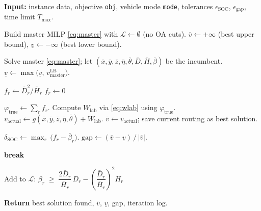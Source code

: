 \begin{algorithm}[t]
\caption{Outer-Approximation L-Shaped Method for the EID-VRP}
\label{alg:lshaped}
\begin{algorithmic}[1]

\State \textbf{Input:} instance data, objective \texttt{obj},
       vehicle mode \texttt{mode}, tolerances $\epsilon_{\text{SOC}}$,
       $\epsilon_{\text{gap}}$, time limit $T_{\max}$.

\State Build master MILP \eqref{eq:master} with
       $\mathcal{L} \leftarrow \emptyset$ (no OA cuts).
\State $\overline{v} \leftarrow +\infty$ \;(best upper bound),\quad
       $\underline{v} \leftarrow -\infty$ \;(best lower bound).

\Repeat

  \State Solve master \eqref{eq:master}; let
         $(\bar{x},\bar{y},\bar{z},\bar{\eta},\bar{\theta},
           \bar{D},\bar{H},\bar{\beta})$ be the incumbent.
  \State $\underline{v} \leftarrow
         \max\!\bigl(\underline{v},\,v^{\text{LB}}_{\text{master}}\bigr)$.

      \State $f_r \leftarrow \bar{D}_r^{2} / \bar{H}_r$
    \Else
      \State $f_r \leftarrow 0$
    \EndIf
  \EndFor

  \State $\varphi_{\text{true}} \leftarrow \sum_r f_r$.
  \State Compute $W_{\text{lab}}$ via \eqref{eq:wlab} using
         $\varphi_{\text{true}}$.
  \State $v_{\text{actual}} \leftarrow
         g(\bar{x},\bar{y},\bar{z},\bar{\eta},\bar{\theta})
         + W_{\text{lab}}$.
    \State $\overline{v} \leftarrow v_{\text{actual}}$;\quad
           save current routing as best solution.
  \EndIf

  \State $\delta_{\text{SOC}} \leftarrow
         \max_{r}\,\bigl(f_r - \bar{\beta}_r\bigr)$.
  \State $\text{gap} \leftarrow
         (\overline{v} - \underline{v})\,/\,|\overline{v}|$.

    \State \textbf{break} 
  \EndIf

    \State Add to $\mathcal{L}$: \quad
           $\beta_r \;\geq\;
            \dfrac{2\bar{D}_r}{\bar{H}_r}\,D_r
            - \left(\dfrac{\bar{D}_r}{\bar{H}_r}\right)^{\!2} H_r$
    \label{alg:cut}
  \EndFor


\State \textbf{Return} best solution found, $\overline{v}$,
       $\underline{v}$, gap, iteration log.

\end{algorithmic}
\end{algorithm}

